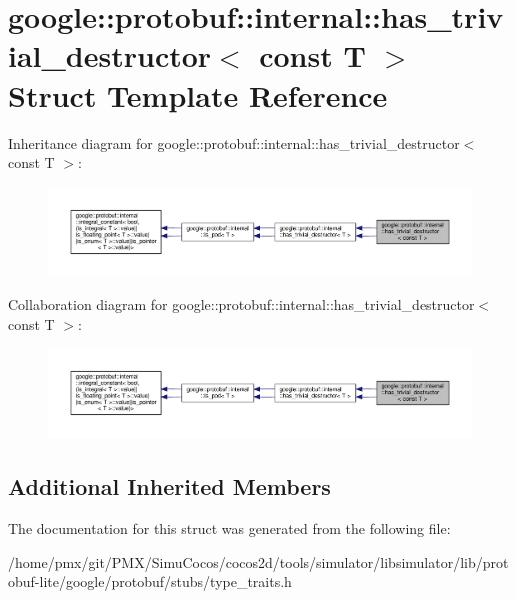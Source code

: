 \hypertarget{structgoogle_1_1protobuf_1_1internal_1_1has__trivial__destructor_3_01const_01T_01_4}{}\section{google\+:\+:protobuf\+:\+:internal\+:\+:has\+\_\+trivial\+\_\+destructor$<$ const T $>$ Struct Template Reference}
\label{structgoogle_1_1protobuf_1_1internal_1_1has__trivial__destructor_3_01const_01T_01_4}


Inheritance diagram for google\+:\+:protobuf\+:\+:internal\+:\+:has\+\_\+trivial\+\_\+destructor$<$ const T $>$\+:
\nopagebreak
\begin{figure}[H]
\begin{center}
\leavevmode
\includegraphics[width=350pt]{structgoogle_1_1protobuf_1_1internal_1_1has__trivial__destructor_3_01const_01T_01_4__inherit__graph}
\end{center}
\end{figure}


Collaboration diagram for google\+:\+:protobuf\+:\+:internal\+:\+:has\+\_\+trivial\+\_\+destructor$<$ const T $>$\+:
\nopagebreak
\begin{figure}[H]
\begin{center}
\leavevmode
\includegraphics[width=350pt]{structgoogle_1_1protobuf_1_1internal_1_1has__trivial__destructor_3_01const_01T_01_4__coll__graph}
\end{center}
\end{figure}
\subsection*{Additional Inherited Members}


The documentation for this struct was generated from the following file\+:\begin{DoxyCompactItemize}
\item 
/home/pmx/git/\+P\+M\+X/\+Simu\+Cocos/cocos2d/tools/simulator/libsimulator/lib/protobuf-\/lite/google/protobuf/stubs/type\+\_\+traits.\+h\end{DoxyCompactItemize}
